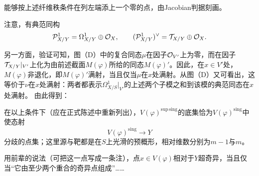 能够按上述纤维秩条件在列左端添上一个零的点，由Jacobian判据刻画。

注意，有典范同构
\[
 \mathcal P^1_{X/Y}=\Omega^1_{X/Y}\oplus\mathcal O_X,
 \qquad (\mathcal P^1_{X/Y})^\vee=\mathcal T_{X/Y}\oplus\mathcal O_X.
\]


另一方面，验证可知，图（D）中的复合同态$\mu$在因子$\mathcal O_{V'}$上为零，而在因子$\mathcal T_{X/Y}|_{V'}$上化为由前述截面$M(\varphi)$所给的同态$M(\varphi)'$。因此，在$x\in V'$处，$M(\varphi)$非退化，即$M(\varphi)'$满射，当且仅当$\mu$在$x$处满射。从图（D）又可看出，这等价于$\nu$在$x$处满射：两者都表示$\Omega^1_{X/S}|_{V'}$的上述两个子模之和到该模的典范同态在$x$处满射。
由此得到：

在以上条件下（应在正式陈述中重新列出），$V(\varphi)^{\mathrm{sup\,sing}}$的底集恰为$V(\varphi)^{\mathrm{sing}}$中使态射
\[
 V(\varphi)^{\mathrm{sing}}\longrightarrow Y
\]
分歧的点集；这里源与靶都是在$S$上光滑的预概形，相对维数分别为$m-1$与$m$。

用前辈的说法（可把这一点写成一条注），点$x\in V(\varphi)$相对于$Y$超奇异，当且仅当“它由至少两个重合的奇异点组成”……

